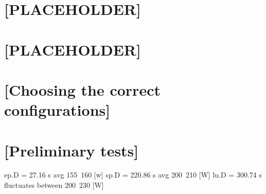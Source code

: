 \section{[PLACEHOLDER]}
\section{[PLACEHOLDER]}
\section{[Choosing the correct configurations]}
\section{[Preliminary tests]}








ep.D = 27.16 s          avg 155~160 [w]
sp.D = 220.86 s         avg 200~210 [W]
lu.D = 300.74 s         fluctuates between 200~230 [W]